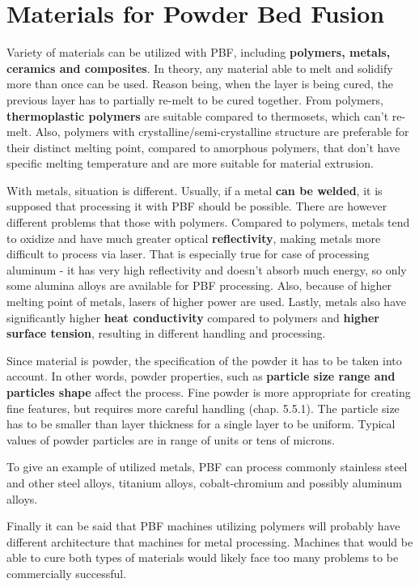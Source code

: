\documentclass[a4paper, twoside, 11pt]{report}
\begin{document}
\section{Materials for Powder Bed Fusion}
Variety of materials can be utilized with PBF, including \textbf{polymers, metals, ceramics and composites}. In theory, any material able to melt and solidify more than once can be used. Reason being, when the layer is being cured, the previous layer has to partially re-melt to be cured together. From polymers, \textbf{thermoplastic polymers} are suitable compared to thermosets, which can't re-melt. Also, polymers with crystalline/semi-crystalline structure are preferable for their distinct melting point, compared to amorphous polymers, that don't have specific melting temperature and are more suitable for material extrusion.

	With metals, situation is different. Usually, if a metal \textbf{can be welded}, it is supposed that processing it with PBF should be possible. There are however different problems that those with polymers. Compared to polymers, metals tend to oxidize and have much greater optical \textbf{reflectivity}, making metals more difficult to process via laser. That is especially true for case of processing aluminum - it has very high reflectivity and doesn't absorb much energy, so only some alumina alloys are available for PBF processing. Also, because of higher melting point of metals, lasers of higher power are used. Lastly, metals also have significantly higher \textbf{heat conductivity} compared to polymers and \textbf{higher surface tension}, resulting in different handling and processing.
	
	Since material is powder, the specification of the powder it has to be taken into account. In other words, powder properties, such as \textbf{particle size range and particles shape} affect the process. Fine powder is more appropriate for creating fine features, but requires more careful handling (chap. 5.5.1). The particle size has to be smaller than layer thickness for a single layer to be uniform. Typical values of powder particles are in range of units or tens of microns.
	
	To give an example of utilized metals, PBF can process commonly stainless steel and other steel alloys, titanium alloys, cobalt-chromium and possibly aluminum alloys.
	
	Finally it can be said that PBF machines utilizing polymers will probably have different architecture that machines for metal processing. Machines that would be able to cure both types of materials would likely face too many problems to be commercially successful.
\end{document}
